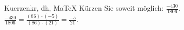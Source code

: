 \begin{MAufgabe}{Kuerzen}{kr, dh, MaTeX}
K\"urzen Sie soweit m\"oglich: $\frac{-430}{1806}$.\\ 
\ifLsg\MLoesung
\quad $\frac{-430}{1806}=\frac{(86)\cdot(-5)}{(86)\cdot(21)}=\frac{-5}{21}$.\else\relax\fi
 \end{MAufgabe}